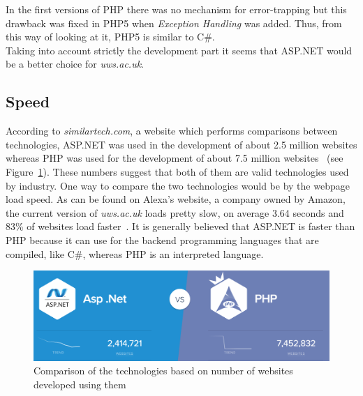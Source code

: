 \documentclass[11]{article}
\begin{document}
	\indent
	In the first versions of PHP there was no mechanism for error-trapping but this drawback was fixed in PHP5 when \textit{Exception Handling} was added. Thus, from this way of looking at it, PHP5 is similar to C\#.\\
	
	\indent
	Taking into account strictly the development part it seems that ASP.NET would be a better choice for \textit{uws.ac.uk}.  


	\subsection{Speed}
   According to \textit{similartech.com}, a website which performs comparisons between technologies, ASP.NET was used in the development of about 2.5 million websites whereas PHP was used for the development of about 7.5 million websites~\citep{CompPhpAsp} (see Figure~\ref{websites}). These numbers suggest that both of them are valid technologies used by industry. One way to compare the two technologies would be by the webpage load speed. As can be found on Alexa's website, a company owned by Amazon, the current version of \textit{uws.ac.uk} loads pretty slow, on average 3.64 seconds and 83\% of websites load faster~\citep{LoadSpeed}.
It is generally believed that  ASP.NET is faster than PHP because it can use for the backend programming languages that are compiled, like C\#, whereas PHP is an interpreted language. \\

	\begin{figure}[H]

			\begin{center}
					\includegraphics[scale = 0.3]{websites.png}
			\end{center}
			\caption{Comparison of the technologies based on number of websites developed using them}
			\label{websites}
	\end{figure}
\end{document}
